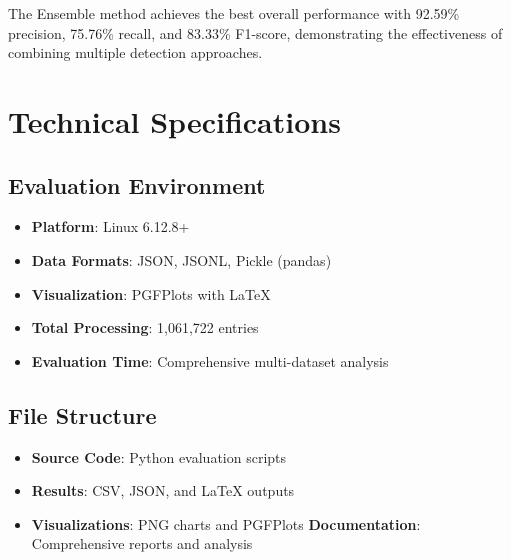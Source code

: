 \documentclass[11pt,a4paper]{article}
\begin{document}
The Ensemble method achieves the best overall performance with 92.59\% precision, 75.76\% recall, and 83.33\% F1-score, demonstrating the effectiveness of combining multiple detection approaches.

\section{Technical Specifications}

\subsection{Evaluation Environment}
\begin{itemize}
    \item \textbf{Platform}: Linux 6.12.8+
    \item \textbf{Data Formats}: JSON, JSONL, Pickle (pandas)
    \item \textbf{Visualization}: PGFPlots with LaTeX
    \item \textbf{Total Processing}: 1,061,722 entries
    \item \textbf{Evaluation Time}: Comprehensive multi-dataset analysis
\end{itemize}

\subsection{File Structure}
\begin{itemize}
    \item \textbf{Source Code}: Python evaluation scripts
    \item \textbf{Results}: CSV, JSON, and LaTeX outputs
    \item \textbf{Visualizations}: PNG charts and PGFPlots
    \textbf{Documentation}: Comprehensive reports and analysis
\end{itemize}
\end{document}
